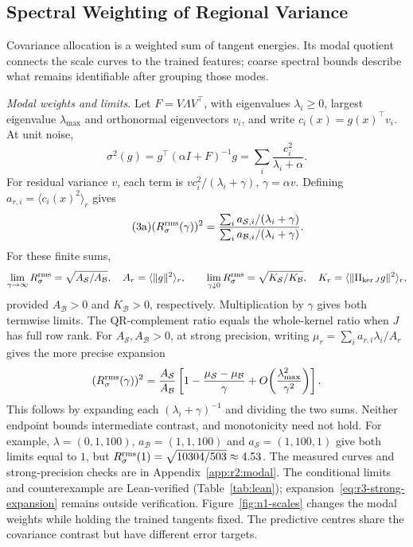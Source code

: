 \subsection{Spectral Weighting of Regional Variance}\label{sec:theory}
\label{sec:theory:bounds}\label{sec:mechanism}\label{sec:mechanism:loading}

Covariance allocation is a weighted sum of tangent energies. Its modal quotient
connects the scale curves to the trained features; coarse spectral bounds describe
what remains identifiable after grouping those modes.

\emph{Modal weights and limits.}
Let $F=V\Lambda V^\top$, with eigenvalues $\lambda_i\ge0$, largest eigenvalue
$\lambda_{\max}$ and orthonormal eigenvectors $v_i$, and write
$c_i(x)=g(x)^\top v_i$. At unit noise,
\begin{equation}\label{eq:sigma-sum}
 \sigma^2(g)=g^\top(\alpha I+F)^{-1}g
           =\sum_i\frac{c_i^2}{\lambda_i+\alpha}.
\end{equation}
For residual variance $v$, each term is $v c_i^2/(\lambda_i+\gamma)$,
$\gamma=\alpha v$. Defining $a_{r,i}=\langle c_i(x)^2\rangle_r$ gives
\begin{equation*}\tag{3a}\label{eq:modal-quotient}
 (R_{\sigma}^{\mathrm{rms}}(\gamma))^2=
 \frac{\sum_i a_{\mathcal S,i}/(\lambda_i+\gamma)}
      {\sum_i a_{\mathcal B,i}/(\lambda_i+\gamma)}.
\end{equation*}
For these finite sums,
\[
 \lim_{\gamma\to\infty}R_{\sigma}^{\mathrm{rms}}=\sqrt{A_{\mathcal S}/A_{\mathcal B}},
 \quad A_r=\langle\|g\|^2\rangle_r,
 \qquad
 \lim_{\gamma\downarrow0}R_{\sigma}^{\mathrm{rms}}=\sqrt{K_{\mathcal S}/K_{\mathcal B}},
 \quad K_r=\langle\|\Pi_{\ker J}g\|^2\rangle_r,
\]
provided $A_{\mathcal B}>0$ and $K_{\mathcal B}>0$, respectively. Multiplication
by $\gamma$ gives both termwise limits. The QR-complement ratio equals the
whole-kernel ratio when $J$ has full row rank. For $A_{\mathcal S},A_{\mathcal B}>0$,
at strong precision, writing
$\mu_r=\sum_i a_{r,i}\lambda_i/A_r$ gives the more precise expansion
\begin{equation}\label{eq:r3-strong-expansion}
 (R_{\sigma}^{\mathrm{rms}}(\gamma))^2=\frac{A_{\mathcal S}}{A_{\mathcal B}}
 \left[1-\frac{\mu_{\mathcal S}-\mu_{\mathcal B}}{\gamma}
       +O\!\left(\frac{\lambda_{\max}^2}{\gamma^2}\right)\right].
\end{equation}
This follows by expanding each $(\lambda_i+\gamma)^{-1}$ and dividing the two
sums. Neither endpoint bounds intermediate contrast, and monotonicity need not
hold. For example,
$\lambda=(0,1,100)$, $a_{\mathcal B}=(1,1,100)$ and
$a_{\mathcal S}=(1,100,1)$ give both limits equal to $1$, but
$R_{\sigma}^{\mathrm{rms}}(1)=\sqrt{10304/503}\approx4.53$.
The measured curves and strong-precision checks are in
Appendix~\ref{app:r2:modal}. The conditional limits and counterexample are
Lean-verified (Table~\ref{tab:lean}); expansion~\eqref{eq:r3-strong-expansion}
remains outside verification.
Figure~\ref{fig:n1-scales} changes the modal weights while holding the trained
tangents fixed. The predictive centres share the covariance contrast but have different error targets.

